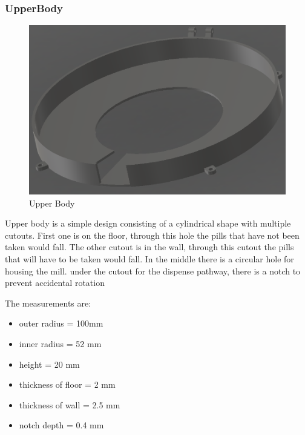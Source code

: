 \subsubsection{UpperBody}
\begin{figure}[h]
	\centering
	\includegraphics[width=0.7\linewidth]{Figures/Screenshot_6}
	\caption[Upper Body]{Upper Body}
	\label{fig:screenshot6}
\end{figure}
Upper body is a simple design consisting of a cylindrical shape with multiple cutouts. First one is on the floor, through this hole the pills that have not been taken would fall. The other cutout is in the wall, through this cutout the pills that will have to be taken would fall. In the middle there is a circular hole for housing the mill. under the cutout for the dispense pathway, there is a notch to prevent accidental rotation

The measurements are:
\begin{itemize}
	\item outer radius = 100mm
	\item inner radius = 52 mm
	\item height = 20 mm
	\item thickness of floor = 2 mm
	\item thickness of wall = 2.5 mm 
	\item notch depth = 0.4 mm
\end{itemize}
\newpage
